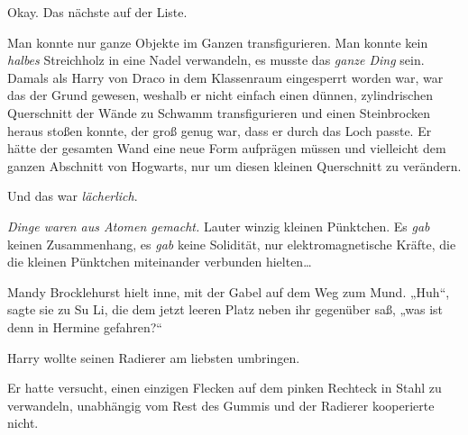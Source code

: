 Okay. Das nächste auf der Liste.

Man konnte nur ganze Objekte im Ganzen transfigurieren. Man konnte kein \emph{halbes} Streichholz in eine Nadel verwandeln, es musste das \emph{ganze Ding} sein. Damals als Harry von Draco in dem Klassenraum eingesperrt worden war, war das der Grund gewesen, weshalb er nicht einfach einen dünnen, zylindrischen Querschnitt der Wände zu Schwamm transfigurieren und einen Steinbrocken heraus stoßen konnte, der groß genug war, dass er durch das Loch passte. Er hätte der gesamten Wand eine neue Form aufprägen müssen und vielleicht dem ganzen Abschnitt von Hogwarts, nur um diesen kleinen Querschnitt zu verändern.

Und das war \emph{lächerlich}.

\emph{Dinge waren aus Atomen gemacht.} Lauter winzig kleinen Pünktchen. Es \emph{gab} keinen Zusammenhang, es \emph{gab} keine Solidität, nur elektromagnetische Kräfte, die die kleinen Pünktchen miteinander verbunden hielten…

\later

Mandy Brocklehurst hielt inne, mit der Gabel auf dem Weg zum Mund. „Huh“, sagte sie zu Su Li, die dem jetzt leeren Platz neben ihr gegenüber saß, „was ist denn in Hermine gefahren?“

\later

Harry wollte seinen Radierer am liebsten umbringen.

Er hatte versucht, einen einzigen Flecken auf dem pinken Rechteck in Stahl zu verwandeln, unabhängig vom Rest des Gummis und der Radierer kooperierte nicht.

